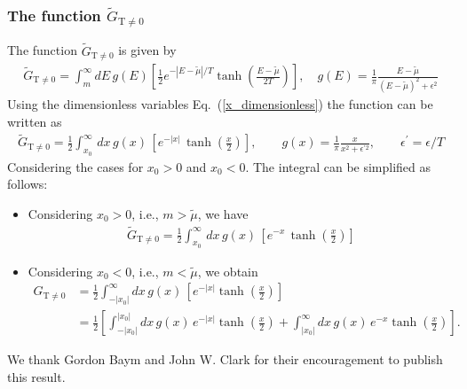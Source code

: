 \documentclass[sn-mathphys,Numbered]{sn-jnl}
\begin{document}
\subsubsection{The function $\tilde G_{\mathrm{T\neq0}}$}
The function $\tilde G_{\mathrm{T\neq0}}$ is given by
\begin{align}
\tilde G_{\mathrm{T\neq0}}=\int^{\infty}_{m}dE\,g(E)\left[\frac{1}{2}e^{ - |E-\widetilde\mu|/T }\tanh\left(\frac{E-\widetilde\mu}{2T}\right)\right],\quad g(E)=\frac{1}{\pi} \frac{E-\tilde\mu}{(E-\tilde\mu)^2+\epsilon^2}
\end{align}
Using the dimensionless variables Eq.~(\ref{x_dimensionless}) the function can be written as
\begin{align}
\tilde G_{\mathrm{T\neq0}}=\frac{1}{2}\int^\infty_{x_0}\,dx\,g(x)\,\left[e^{-|x|}\,\tanh\left(\frac{x}{2}\right)\right],\qquad g(x)=\frac{1}{\pi} \frac{x}{x^2+\epsilon^{\prime2}},\qquad \epsilon^\prime=\epsilon/T
\end{align}
Considering the cases for $x_0>0$ and  $x_0<0$. The integral can be simplified as follows:
\begin{itemize}
  \item Considering $x_0>0$, i.e., $m>\tilde\mu$, we have
  \begin{align}
  \tilde G_{\mathrm{T\neq0}}=\frac{1}{2}\int^\infty_{x_0}\,dx\,g(x)\,\left[e^{-x}\,\tanh\left(\frac{x}{2}\right)\right]
  \end{align}
  \item Considering $x_0<0$, i.e., $m<\tilde\mu$, we obtain
  \begin{align}
    G_{\mathrm{T\neq0}}&=\frac{1}{2}\int^\infty_{-|x_0|}dx\,g(x)\,\left[e^{-|x|}\tanh\left(\frac{x}{2}\right)\right]\\
   &=\frac{1}{2}\left[\int_{-|x_0|}^{|x_0|}dx\,g(x)\,e^{-|x|}\tanh\left(\frac{x}{2}\right)+\int^\infty_{|x_0|}dx\,g(x)\,e^{-x}\tanh\left(\frac{x}{2}\right)\right].
  \end{align}
\end{itemize}

\backmatter

We thank Gordon Baym and John W. Clark for their encouragement to publish this result.


\end{document}
